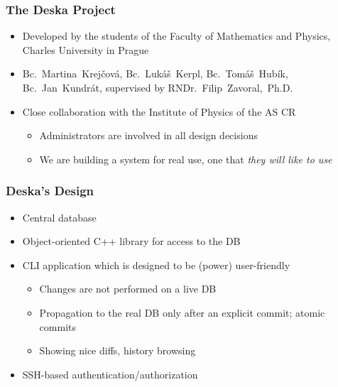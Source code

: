 \documentclass{beamer}
\begin{document}
\begin{frame}[fragile]
\frametitle{The Deska Project}
\begin{itemize}
    \item Developed by the students of the Faculty of Mathematics and Physics, Charles University in Prague
    \item Bc.~Martina~Krejčová, Bc.~Lukáš~Kerpl, Bc.~Tomáš~Hubík, Bc.~Jan~Kundrát,
        supervised by RNDr.~Filip~Zavoral,~Ph.D.
    \item Close collaboration with the Institute of Physics of the AS CR
        \begin{itemize}
            \item Administrators are involved in all design decisions
            \item We are building a system for real use, one that \em{they will like to use}
        \end{itemize}
\end{itemize}
\end{frame}

\begin{frame}[fragile]
\frametitle{Deska's Design}
\begin{itemize}
    \item Central database
    \item Object-oriented C++ library for access to the DB
    \item CLI application which is designed to be (power) user-friendly
        \begin{itemize}
            \item Changes are not performed on a live DB
            \item Propagation to the real DB only after an explicit commit; atomic commits
            \item Showing nice diffs, history browsing
        \end{itemize}
    \item SSH-based authentication/authorization
\end{itemize}
\end{frame}
\end{document}
